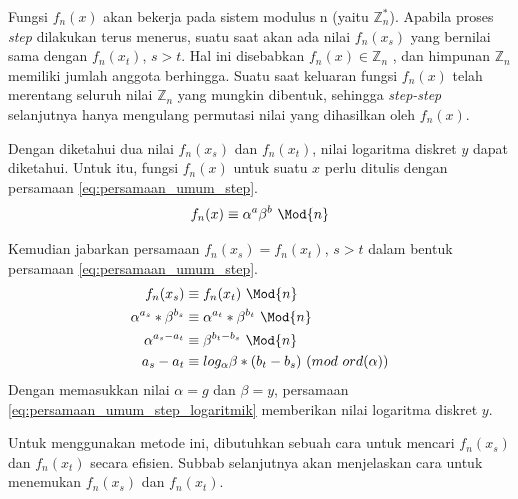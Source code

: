 Fungsi $ f_n (x) $ akan bekerja pada sistem modulus n (yaitu $ \mathbb{Z}_n^* $). Apabila proses \textit{step} dilakukan terus menerus, suatu saat akan ada nilai $ f_n (x_s) $ yang bernilai sama dengan $ f_n (x_t) $, $ s>t $. Hal ini disebabkan $ f_n (x) \in \mathbb{Z}_n $ , dan himpunan $ \mathbb{Z}_n $ memiliki jumlah anggota berhingga. Suatu saat keluaran fungsi $ f_n (x) $ telah merentang seluruh nilai $ \mathbb{Z}_n $ yang mungkin dibentuk, sehingga \textit{step-step} selanjutnya hanya mengulang permutasi nilai yang dihasilkan oleh $ f_n (x) $.\cite{brent_montecarlo}

Dengan diketahui dua nilai $ f_n (x_s) $ dan $ f_n (x_t) $, nilai logaritma diskret $ y $ dapat diketahui. Untuk itu, fungsi $ f_n (x) $ untuk suatu $ x $ perlu ditulis dengan persamaan \eqref{eq:persamaan_umum_step}.
\begin{equation}
f_n (x)\equiv \alpha^a \beta^b\ \Mod{n}
\label{eq:persamaan_umum_step}
\end{equation}

Kemudian jabarkan persamaan $ f_n (x_s)=f_n (x_t) $, $ s>t $ dalam bentuk persamaan \eqref{eq:persamaan_umum_step}.
\begin{align}
f_n (x_s) &\equiv f_n (x_t)\ \Mod{n} \\
\alpha^{a_s} * \beta^{b_s} &\equiv \alpha^{a_t} * \beta^{b_t}\ \Mod{n} \\
\alpha^{a_s-a_t} &\equiv \beta^{b_t-b_s}\ \Mod{n} \\
a_s - a_t &\equiv log_{\alpha} \beta * (b_t - b_s)\ (mod\ ord(\alpha))
\label{eq:persamaan_umum_step_logaritmik}
\end{align}
Dengan memasukkan nilai $ \alpha=g $ dan $ \beta=y $, persamaan \eqref{eq:persamaan_umum_step_logaritmik} memberikan nilai logaritma diskret $ y $.

Untuk menggunakan metode ini, dibutuhkan sebuah cara untuk mencari $ f_n (x_s) $ dan $ f_n (x_t) $ secara efisien. Subbab selanjutnya akan menjelaskan cara untuk menemukan $ f_n (x_s) $ dan $ f_n (x_t) $.

